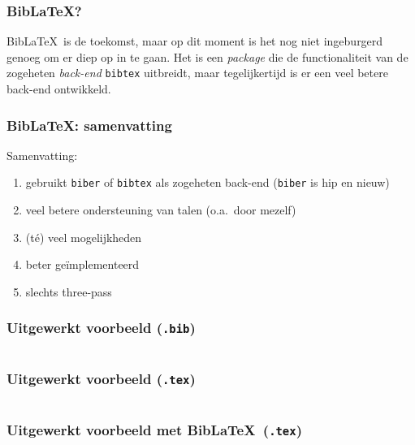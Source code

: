 \begin{frame}[fragile]
  \frametitle{Bib\LaTeX?}

  Bib\LaTeX\ is de toekomst, maar op dit moment is het nog niet ingeburgerd genoeg om er diep op in te gaan. Het is een \emph{package} die de functionaliteit van de zogeheten \emph{back-end} \texttt{bibtex} uitbreidt, maar tegelijkertijd is er een veel betere back-end ontwikkeld.
\end{frame}


\begin{frame}[fragile]
  \frametitle{Bib\LaTeX: samenvatting}

  Samenvatting:
  \begin{enumerate}
    \item gebruikt \verb|biber| of \verb|bibtex| als zogeheten back-end (\verb|biber| is hip en nieuw)
    \item veel betere ondersteuning van talen (o.a.\ door mezelf) 
    \item (t\'e) veel mogelijkheden
    \item beter ge\"implementeerd
    \item slechts three-pass
  \end{enumerate}
\end{frame}

\begin{frame}[fragile]
  \frametitle{Uitgewerkt voorbeeld (\texttt{.bib})}

  \inputminted{tex}{bib-example.bib}
\end{frame}

\begin{frame}[fragile]
  \frametitle{Uitgewerkt voorbeeld (\texttt{.tex})}

  \scriptsize
  \inputminted{tex}{bib-example.tex}
\end{frame}

\begin{frame}[fragile]
  \frametitle{Uitgewerkt voorbeeld met Bib\LaTeX\ (\texttt{.tex})}

  \scriptsize
  \inputminted{tex}{bib-example-biblatex.tex}
\end{frame}

%
%
%
%
